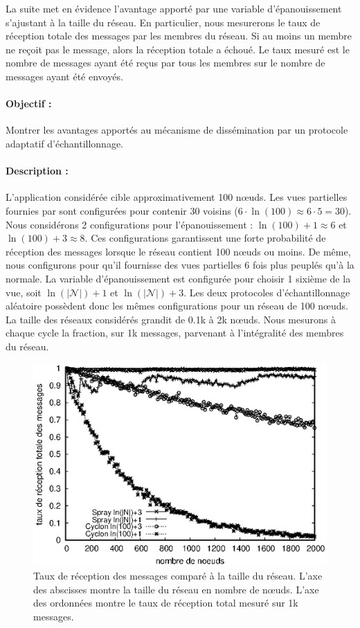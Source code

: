 La suite met en évidence l'avantage apporté par une variable d'épanouissement
s'ajustant à la taille du réseau. En particulier, nous mesurerons le taux de
réception totale des messages par les membres du réseau. Si au moins un membre
ne reçoit pas le message, alors la réception totale a échoué. Le taux mesuré est
le nombre de messages ayant été reçus par tous les membres sur le nombre de
messages ayant été envoyés.

\paragraph{Objectif :} Montrer les avantages apportés au mécanisme de
dissémination par un protocole adaptatif d'échantillonnage.

\paragraph{Description :} L'application considérée cible approximativement 100
nœuds. Les vues partielles fournies par \CYCLON sont configurées pour contenir
30 voisins ($6 \cdot \ln(100) \approx 6 \cdot 5 = 30$). Nous considérons 2
configurations pour l'épanouissement : $\ln(100)+1 \approx 6$ et
$\ln(100)+3 \approx 8$. Ces configurations garantissent une forte probabilité de
réception des messages lorsque le réseau contient 100 nœuds ou moins. De même,
nous configurons \SPRAY pour qu'il fournisse des vues partielles 6 fois plus
peuplés qu'à la normale. La variable d'épanouissement est configurée pour
choisir 1 sixième de la vue, soit $\ln(|\mathcal{N}|)+1$ et
$\ln(|\mathcal{N}|)+3$.  Les deux protocoles d'échantillonnage aléatoire
possèdent donc les mêmes configurations pour un réseau de 100 nœuds. La taille
des réseaux considérés grandit de 0.1k à 2k nœuds. Nous mesurons à chaque cycle
la fraction, sur 1k messages, parvenant à l'intégralité des membres du réseau.

\begin{figure}
  \begin{center}
    \includegraphics[width=.8\textwidth]{img/spray/hardrate.eps}
    \caption[Taux de réception des messages comparé à la taille du
    réseau.]{\label{net:fig:hardrate} Taux de réception des messages comparé à
      la taille du réseau. L'axe des abscisses montre la taille du réseau en
      nombre de nœuds. L'axe des ordonnées montre le taux de réception total
      mesuré sur 1k messages.}
  \end{center}
\end{figure}

